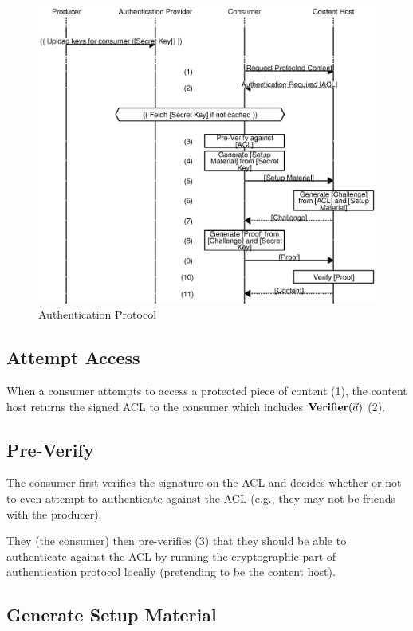 \documentclass[pdftex,12pt,a4papaer,twoside,notitlepage]{report}
\begin{document}
\begin{figure}
    \includegraphics{auth.eps}
    \caption{Authentication Protocol}
    \label{fig:auth2}
\end{figure}

\subsection{Attempt Access}

When a consumer attempts to access a protected piece of content (1), the content
host returns the signed ACL to the consumer which includes $\operatorname{\mathbf{Verifier}}(\vec{a})$ (2).

\subsection{Pre-Verify}

The consumer first verifies the signature on the ACL and decides whether or not
to even attempt to authenticate against the ACL (e.g., they may not be friends
with the producer).

They (the consumer) then pre-verifies (3) that they should be able to
authenticate against the ACL by running the cryptographic part of
authentication protocol locally (pretending to be the content host).

\subsection{Generate Setup Material}
\end{document}
